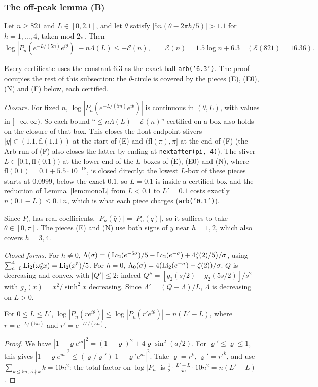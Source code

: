 \subsubsection{The off-peak lemma (B)}\label{sec:offpeak}

\begin{lemma}\label{lem:offpeak}
Let $n\ge821$ and $L\in[0,2.1]$, and let $\theta$ satisfy $|5n(\theta-2\pi h/5)|>1.1$ for $h=1,\dots,4$, taken mod $2\pi$.
Then
\[
\log|P_n(e^{-L/(5n)}e^{i\theta})|-n\Lambda(L)\le-\mathcal E(n),\qquad \mathcal E(n)=1.5\log n+6.3\quad(\mathcal E(821)=16.36).
\]
\end{lemma}
Every certificate uses the constant $6.3$ as the exact ball \texttt{arb('6.3')}. The proof occupies the rest of this
subsection: the $\theta$-circle is covered by the pieces (E), (E0), (N) and (F) below, each certified.

\emph{Closure.} For fixed $n$, $\log|P_n(e^{-L/(5n)}e^{i\theta})|$ is continuous in $(\theta,L)$, with values in
$[-\infty,\infty)$. So each bound ``$\le n\Lambda(L)-\mathcal E(n)$'' certified on a box also holds on the closure of that
box. This closes the float-endpoint slivers $|y|\in(1.1,\mathrm{fl}(1.1))$ at the start of (E) and $(\mathrm{fl}(\pi),\pi]$
at the end of (F) (the Arb run of (F) also closes the latter by ending at \texttt{nextafter(pi, 4)}). The sliver
$L\in[0.1,\mathrm{fl}(0.1))$ at the lower end of the $L$-boxes of (E), (E0) and (N), where
$\mathrm{fl}(0.1)=0.1+5.5\cdot10^{-18}$, is closed directly: the lowest $L$-box of these pieces starts at $0.0999$, below the
exact $0.1$, so $L=0.1$ is inside a certified box and the reduction of Lemma~\ref{lem:monoL} from $L<0.1$ to $L'=0.1$ costs
exactly $n(0.1-L)\le 0.1\,n$, which is what each piece charges (\texttt{arb('0.1')}).

Since $P_n$ has real coefficients, $|P_n(\bar q)|=|P_n(q)|$, so it suffices to take $\theta\in[0,\pi]$. The pieces (E) and
(N) use both signs of $y$ near $h=1,2$, which also covers $h=3,4$.

\emph{Closed forms.} For $h\ne0$,
$\Lambda(\sigma)=\big(\operatorname{Li}_2(e^{-5\sigma})/5-\operatorname{Li}_2(e^{-\sigma})+4\zeta(2)/5\big)/\sigma$, using
$\sum_{c=0}^4\operatorname{Li}_2(\omega_5^cx)=\operatorname{Li}_2(x^5)/5$. For $h=0$, $\Lambda_0(\sigma)=4(\operatorname{Li}_2(e^{-\sigma})-\zeta(2))/\sigma$. $Q$ is
decreasing and convex with $|Q'|\le2$: indeed $Q''=[g_2(s/2)-g_2(5s/2)]/s^2$ with $g_2(x)=x^2/\sinh^2x$ decreasing. Since
$\Lambda'=(Q-\Lambda)/L$, $\Lambda$ is decreasing on $L>0$.

\begin{lemma}[monotonicity in $L$]\label{lem:monoL}
For $0\le L\le L'$,
$\log|P_n(re^{i\theta})|\le\log|P_n(r'e^{i\theta})|+n(L'-L)$, where $r=e^{-L/(5n)}$ and $r'=e^{-L'/(5n)}$.
\end{lemma}
\begin{proof}
We have $|1-\varrho e^{ia}|^2=(1-\varrho)^2+4\varrho\sin^2(a/2)$. For $\varrho'\le\varrho\le1$, this gives
$|1-\varrho e^{ia}|^2\le(\varrho/\varrho')|1-\varrho'e^{ia}|^2$. Take $\varrho=r^k$, $\varrho'=r'^k$, and use
$\sum_{k\le5n,\,5\nmid k}k=10n^2$: the total factor on $\log|P_n|$ is $\frac12\cdot\frac{L'-L}{5n}\cdot10n^2=n(L'-L)$.
\end{proof}


